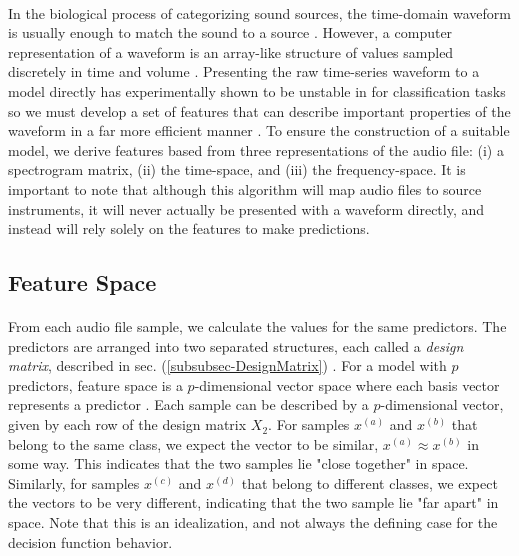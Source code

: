 \documentclass[12pt,letterpaper]{article}
\begin{document}
\paragraph*{}In the biological process of categorizing sound sources, the time-domain waveform is usually enough to match the sound to a source \cite{Olson}. However, a computer representation of a waveform is an array-like structure of values sampled discretely in time and volume \cite{Virtanen,Liu}. Presenting the raw time-series waveform to a model directly has experimentally shown to be unstable in for classification tasks so we must develop a set of features that can describe important properties of the waveform in a far more efficient manner \cite{Goodfellow,James,Serizel}. To ensure the construction of a suitable model, we derive features based from three representations of the audio file: (i) a spectrogram matrix, (ii) the time-space, and (iii) the frequency-space. It is important to note that although this algorithm will map audio files to source instruments, it will never actually be presented with a waveform directly, and instead will rely solely on the features to make predictions.


\subsection{Feature Space}

\paragraph*{}From each audio file sample, we calculate the values for the same predictors. The predictors are arranged into two separated structures, each called a \textit{design matrix}, described in sec. (\ref{subsubsec-DesignMatrix}) \cite{Goodfellow,Geron}. For a model with $p$ predictors, feature space is a $p$-dimensional vector space where each basis vector represents a predictor \cite{Goodfellow,James}. Each sample can be described by a $p$-dimensional vector, given by each row of the design matrix $X_2$. For samples $x^{(a)}$ and $x^{(b)}$ that belong to the same class, we expect the vector to be similar, $x^{(a)} \approx x^{(b)}$ in some way. This indicates that the two samples lie "close together" in space. Similarly, for samples $x^{(c)}$ and $x^{(d)}$ that belong to different classes, we expect the vectors to be very different, indicating that the two sample lie "far apart" in space. Note that this is an idealization, and not always the defining case for the decision function behavior.
\end{document}
